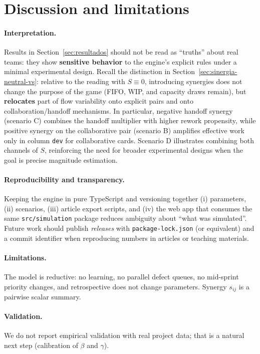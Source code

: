 \section{Discussion and limitations}
\label{sec:discussao}

\paragraph{Interpretation.}
Results in Section~\ref{sec:resultados} should not be read as ``truths'' about real teams: they show \textbf{sensitive behavior} to the engine's explicit rules under a minimal experimental design. Recall the distinction in Section~\ref{sec:sinergia-neutral-vs}: relative to the reading with $S\equiv 0$, introducing synergies does not change the purpose of the game (FIFO, WIP, and capacity draws remain), but \textbf{relocates} part of flow variability onto explicit pairs and onto collaboration/handoff mechanisms. In particular, negative handoff synergy (scenario C) combines the handoff multiplier with higher rework propensity, while positive synergy on the collaborative pair (scenario B) amplifies effective work only in column \texttt{dev} for collaborative cards. Scenario D illustrates combining both channels of $S$, reinforcing the need for broader experimental designs when the goal is precise magnitude estimation.

\paragraph{Reproducibility and transparency.}
Keeping the engine in pure TypeScript and versioning together (i) parameters, (ii) scenarios, (iii) article export scripts, and (iv) the web app that consumes the same \texttt{src/simulation} package reduces ambiguity about ``what was simulated''. Future work should publish \emph{releases} with \texttt{package-lock.json} (or equivalent) and a commit identifier when reproducing numbers in articles or teaching materials.

\paragraph{Limitations.}
The model is reductive: no learning, no parallel defect queues, no mid-sprint priority changes, and retrospective does not change parameters. Synergy $s_{ij}$ is a pairwise scalar summary.

\paragraph{Validation.}
We do not report empirical validation with real project data; that is a natural next step (calibration of $\beta$ and $\gamma$).
